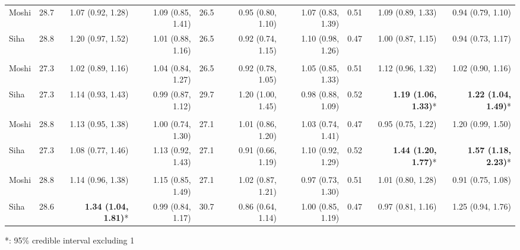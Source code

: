 \begin{table}[t]
\begin{tabular*}{\linewidth}{@{\extracolsep{\fill}}l|rrrrrrrrr}
\midrule\addlinespace[2.5pt]
\multicolumn{10}{l}{Diarrhea} \\[2.5pt] 
\midrule\addlinespace[2.5pt]
Moshi & 28.7 & 1.07 (0.92, 1.28) & 1.09 (0.85, 1.41) & 26.5 & 0.95 (0.80, 1.10) & 1.07 (0.83, 1.39) & 0.51 & 1.09 (0.89, 1.33) & 0.94 (0.79, 1.10) \\ 
Siha & 28.8 & 1.20 (0.97, 1.52) & 1.01 (0.88, 1.16) & 26.5 & 0.92 (0.74, 1.15) & 1.10 (0.98, 1.26) & 0.47 & 1.00 (0.87, 1.15) & 0.94 (0.73, 1.17) \\ 
\midrule\addlinespace[2.5pt]
\multicolumn{10}{l}{Urinary Tract Infections} \\[2.5pt] 
\midrule\addlinespace[2.5pt]
Moshi & 27.3 & 1.02 (0.89, 1.16) & 1.04 (0.84, 1.27) & 26.5 & 0.92 (0.78, 1.05) & 1.05 (0.85, 1.33) & 0.51 & 1.12 (0.96, 1.32) & 1.02 (0.90, 1.16) \\ 
Siha & 27.3 & 1.14 (0.93, 1.43) & 0.99 (0.87, 1.12) & 29.7 & 1.20 (1.00, 1.45) & 0.98 (0.88, 1.09) & 0.52 & \textbf{1.19 (1.06, 1.33)}* & \textbf{1.22 (1.04, 1.49)}* \\ 
\midrule\addlinespace[2.5pt]
\multicolumn{10}{l}{Malaria} \\[2.5pt] 
\midrule\addlinespace[2.5pt]
Moshi & 28.8 & 1.13 (0.95, 1.38) & 1.00 (0.74, 1.30) & 27.1 & 1.01 (0.86, 1.20) & 1.03 (0.74, 1.41) & 0.47 & 0.95 (0.75, 1.22) & 1.20 (0.99, 1.50) \\ 
Siha & 27.3 & 1.08 (0.77, 1.46) & 1.13 (0.92, 1.43) & 27.1 & 0.91 (0.66, 1.19) & 1.10 (0.92, 1.29) & 0.52 & \textbf{1.44 (1.20, 1.77)}* & \textbf{1.57 (1.18, 2.23)}* \\ 
\midrule\addlinespace[2.5pt]
\multicolumn{10}{l}{Infectious Eye Disease} \\[2.5pt] 
\midrule\addlinespace[2.5pt]
Moshi & 28.8 & 1.14 (0.96, 1.38) & 1.15 (0.85, 1.49) & 27.1 & 1.02 (0.87, 1.21) & 0.97 (0.73, 1.30) & 0.51 & 1.01 (0.80, 1.28) & 0.91 (0.75, 1.08) \\ 
Siha & 28.6 & \textbf{1.34 (1.04, 1.81)}* & 0.99 (0.84, 1.17) & 30.7 & 0.86 (0.64, 1.14) & 1.00 (0.85, 1.19) & 0.47 & 0.97 (0.81, 1.16) & 1.25 (0.94, 1.76) \\ 
\bottomrule
\end{tabular*}
\begin{minipage}{\linewidth}
*: 95\% credible interval excluding 1\\
\end{minipage}
\end{table}

